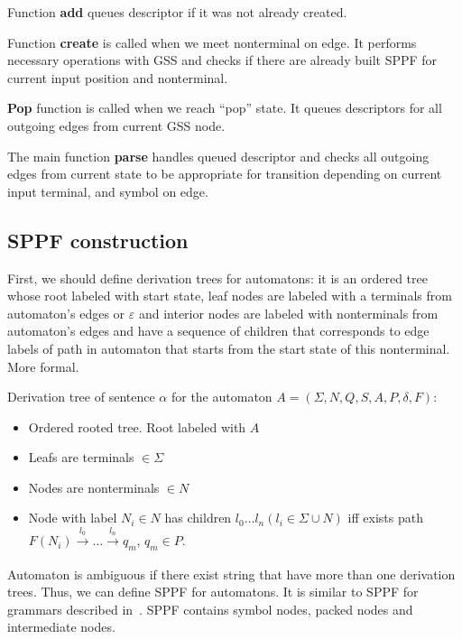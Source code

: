 \documentclass[runningheads,a4paper]{llncs}
\begin{document}

Function \textbf{add} queues descriptor if it was not already created.

Function \textbf{create} is called when we meet nonterminal on edge.
It performs necessary operations with GSS and checks if there are already built SPPF for current
input position and nonterminal.

\textbf{Pop} function is called when we reach ``pop'' state. It queues descriptors for all outgoing edges from current GSS node.

The main function \textbf{parse} handles queued descriptor and checks all outgoing edges from current state to be appropriate
for transition depending on current input terminal, and symbol on edge.


\subsection{SPPF construction}

First, we should define derivation trees for automatons: it is an ordered tree whose root labeled with start state,
leaf nodes are labeled with a terminals from automaton's edges or $\varepsilon$ and interior nodes are labeled with 
nonterminals from automaton's edges and have a sequence of children that corresponds to edge labels of path in 
automaton that starts from the start state of this nonterminal. More formal. 

\begin{mydef}

Derivation tree of sentence $\alpha$ for the automaton $A=(\Sigma, N, Q, S, A, P, \delta, F)$:%

\begin{itemize}
\item Ordered rooted tree. Root labeled with $A$
\item Leafs are terminals $\in \Sigma$
\item Nodes are nonterminals $\in N$
\item Node with label $N_i \in N$ has children $l_0 \dots l_n (l_i \in \Sigma \cup N)$ iff exists
path
$F(N_i) \xrightarrow[]{l_0} \dots \xrightarrow{l_n} q_m$, $q_m \in P$. 
\end{itemize}

\end{mydef}

Automaton is ambiguous if there exist string that have more than one derivation trees. Thus, we can define SPPF for automatons. 
It is similar to SPPF for grammars described in~\cite{scott2013gll}. SPPF contains symbol nodes, packed nodes
and intermediate nodes. 
\end{document}
